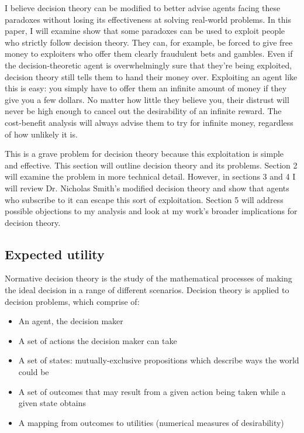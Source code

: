 \documentclass{article}
\begin{document}
I believe decision theory can be modified to better advise agents facing these paradoxes without losing its effectiveness at solving real-world problems. In this paper, I will examine show that some paradoxes can be used to exploit people who strictly follow decision theory. They can, for example, be forced to give free money to exploiters who offer them clearly fraudulent bets and gambles. Even if the decision-theoretic agent is overwhelmingly sure that they're being exploited, decision theory still tells them to hand their money over. Exploiting an agent like this is easy: you simply have to offer them an infinite amount of money if they give you a few dollars. No matter how little they believe you, their distrust will never be high enough to cancel out the desirability of an infinite reward. The cost-benefit analysis will always advise them to try for infinite money, regardless of how unlikely it is.

This is a grave problem for decision theory because this exploitation is simple and effective. This section will outline decision theory and its problems. Section 2 will examine the problem in more technical detail. However, in sections 3 and 4 I will review Dr. Nicholas Smith's modified decision theory \citep{smith2014evaluative} and show that agents who subscribe to it can escape this sort of exploitation. Section 5 will address possible objections to my analysis and look at my work's broader implications for decision theory.

\subsection{Expected utility}
Normative decision theory is the study of the mathematical processes of making the ideal decision in a range of different scenarios. Decision theory is applied to decision problems, which comprise of:

\begin{itemize}  
\item An agent, the decision maker
\item A set of actions the decision maker can take
\item A set of states: mutually-exclusive propositions which describe ways the world could be
\item A set of outcomes that may result from a given action being taken while a given state obtains
\item A mapping from outcomes to utilities (numerical measures of desirability)
\end{itemize}
\end{document}

